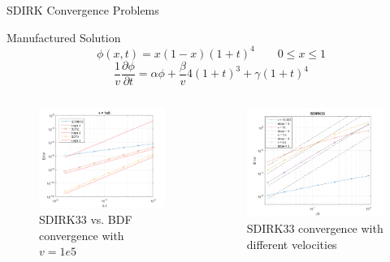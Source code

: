 \documentclass[8pt,xcolor=dvipnames]{beamer}
\newcommand{\be}{\begin{equation*}}
\newcommand{\ee}{\end{equation*}}
\newcommand{\qq}{\quad\quad}
\newcommand{\backupend}{
   \setcounter{framenumber}{\value{finalframe}}
}
\begin{document}
\begin{frame}{SDIRK Convergence Problems}

\begin{block}{Manufactured Solution}
\be 
\phi(x,t) = x(1-x)(1+t)^4 \qq 0 \leq x \leq 1
\ee
\be 
\frac{1}{v}\frac{\partial\phi}{\partial t} = \alpha\phi + \frac{\beta}{v}4(1+t)^3 + \gamma(1+t)^4
\ee
\end{block}

\begin{columns}

\begin{figure}
\includegraphics[width=\linewidth]{figures/sdirk_mms1.png}
\caption{SDIRK33 vs. BDF convergence with $v=1e5$}
\end{figure}

\begin{figure}
\includegraphics[width=\linewidth]{figures/sdirk_mms2.png}
\caption{SDIRK33 convergence with different velocities}
\end{figure}

\end{columns}

\end{frame}

\backupend

\end{document}
